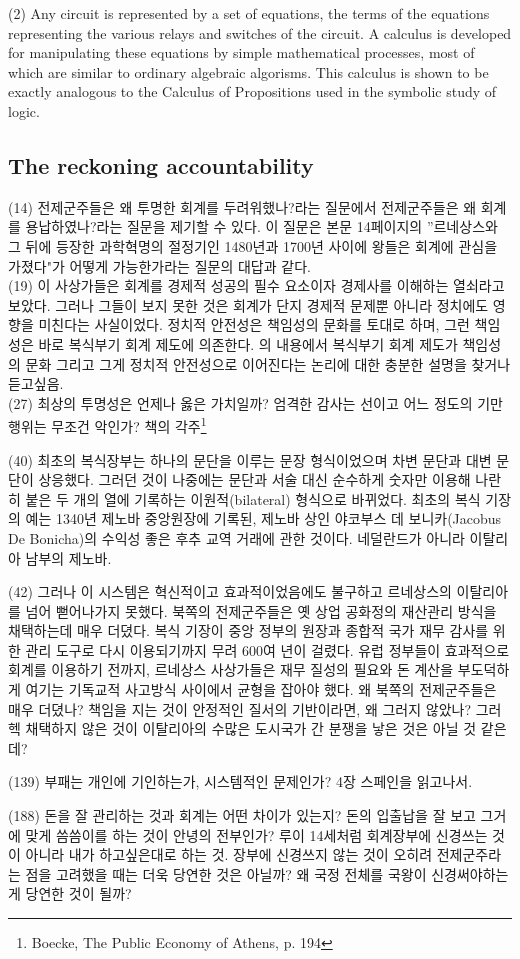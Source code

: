 \documentclass[11pt, a4paper]{article}
\begin{document}
(2) Any circuit is represented by a set of equations,
the terms of the equations representing the
various relays and switches of the circuit. A calculus
is developed for manipulating these equations
by simple mathematical processes, most of which are
similar to ordinary algebraic algorisms. This calculus
is shown to be exactly analogous to the Calculus
of Propositions used in the symbolic study of
logic. \\

\newpage

\subsection{The reckoning accountability}

(14) 전제군주들은 왜 투명한 회계를 두려워했나?라는 질문에서 전제군주들은 왜 회계를 용납하였나?라는 질문을 제기할 수 있다. 이 질문은 본문 14페이지의 ''르네상스와 그 뒤에 등장한 과학혁명의 절정기인 1480년과 1700년 사이에 왕들은 회계에 관심을 가졌다"가 어떻게 가능한가라는 질문의 대답과 같다. \\

(19) 이 사상가들은 회계를 경제적 성공의 필수 요소이자 경제사를 이해하는 열쇠라고 보았다. 그러나 그들이 보지 못한 것은 회계가 단지 경제적 문제뿐 아니라 정치에도 영향을 미친다는 사실이었다. 정치적 안전성은 책임성의 문화를 토대로 하며, 그런 책임성은 바로 복식부기 회계 제도에 의존한다. 의 내용에서 복식부기 회계 제도가 책임성의 문화 그리고 그게 정치적 안전성으로 이어진다는 논리에 대한 충분한 설명을 찾거나 듣고싶음. \\ 

(27) 최상의 투명성은 언제나 옳은 가치일까? 엄격한 감사는 선이고 어느 정도의 기만행위는 무조건 악인가? 책의 각주\footnote{Boecke, The Public Economy of Athens, p. 194} 

(40) 최초의 복식장부는 하나의 문단을 이루는 문장 형식이었으며 차변 문단과 대변 문단이 상응했다. 그러던 것이 나중에는 문단과 서술 대신 순수하게 숫자만 이용해 나란히 붙은 두 개의 열에 기록하는 이원적(bilateral) 형식으로 바뀌었다. 최초의 복식 기장의 예는 1340년 제노바 중앙원장에 기록된, 제노바 상인 야코부스 데 보니카(Jacobus De Bonicha)의 수익성 좋은 후추 교역 거래에 관한 것이다. 네덜란드가 아니라 이탈리아 남부의 제노바.

(42) 그러나 이 시스템은 혁신적이고 효과적이었음에도 불구하고 르네상스의 이탈리아를 넘어 뻗어나가지 못했다. 북쪽의 전제군주들은 옛 상업 공화정의 재산관리 방식을 채택하는데 매우 더뎠다. 복식 기장이 중앙 정부의 원장과 종합적 국가 재무 감사를 위한 관리 도구로 다시 이용되기까지 무려 600여 년이 걸렸다. 유럽 정부들이 효과적으로 회계를 이용하기 전까지, 르네상스 사상가들은 재무 질성의 필요와 돈 계산을 부도덕하게 여기는 기독교적 사고방식 사이에서 균형을 잡아야 했다. 왜 북쪽의 전제군주들은 매우 더뎠나? 책임을 지는 것이 안정적인 질서의 기반이라면, 왜 그러지 않았나? 그러헥 채택하지 않은 것이 이탈리아의 수많은 도시국가 간 분쟁을 낳은 것은 아닐 것 같은데?

(139) 부패는 개인에 기인하는가, 시스템적인 문제인가? 4장 스페인을 읽고나서. 

(188) 돈을 잘 관리하는 것과 회계는 어떤 차이가 있는지? 돈의 입출납을 잘 보고 그거에 맞게 씀씀이를 하는 것이 안녕의 전부인가? 루이 14세처럼 회계장부에 신경쓰는 것이 아니라 내가 하고싶은대로 하는 것. 장부에 신경쓰지 않는 것이 오히려 전제군주라는 점을 고려했을 때는 더욱 당연한 것은 아닐까? 왜 국정 전체를 국왕이 신경써야하는게 당연한 것이 될까?
\end{document}
